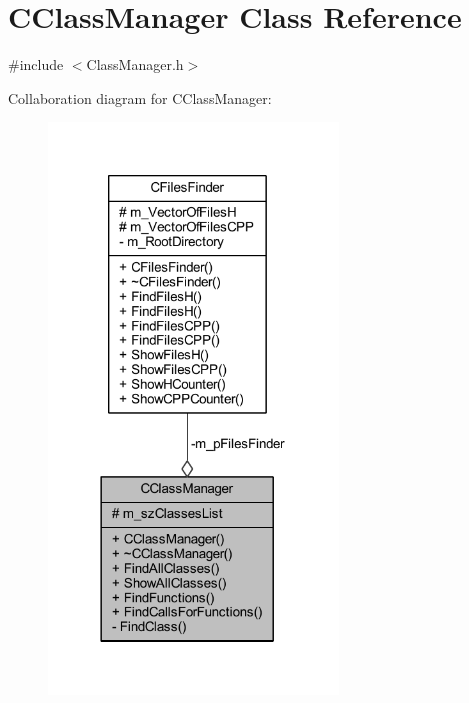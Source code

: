 \hypertarget{class_c_class_manager}{\section{C\+Class\+Manager Class Reference}
\label{class_c_class_manager}
}


{\ttfamily \#include $<$Class\+Manager.\+h$>$}



Collaboration diagram for C\+Class\+Manager\+:
\nopagebreak
\begin{figure}[H]
\begin{center}
\leavevmode
\includegraphics[width=218pt]{class_c_class_manager__coll__graph}
\end{center}
\end{figure}
